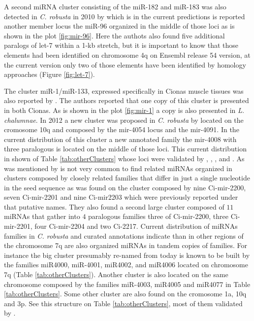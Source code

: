 \documentclass[graybox]{svmult}
\begin{document}
A second miRNA cluster consisting of the miR-182 and miR-183 was also detected 
in \textit{C. robusta} in 2010 by \cite{Keshavan2010} which is in the 
current predictions is reported another member locus the miR-96 organized in 
the middle of those loci as is shown in the plot \ref{fig:mir-96}. 
Here the authots also found five additional paralogs of let-7 within a 1-kb 
stretch, but it is important to know that those elements had been identified on 
chromosome 4q on Ensembl release 54 version, at the current version only 
two of those elements have been identified by homology approaches (Figure 
\ref{fig:let-7}).

The cluster miR-1/miR-133, expressed specifically in Cionas muscle tissues was 
also reported by \cite{Kusakabe2013}. The authors reported that one copy of 
this cluster is presented in both Cionas. As is shown in the plot 
\ref{fig:mir-1} a copy is also presented in \textit{L. chalumnae}. In 2012 a 
new cluster was proposed in \textit{C. robusta} by \cite{Terai2012} located 
on the cromosome 10q and composed by the mir-4054 locus and the mir-4091. In 
the current distribution of this cluster a new annotated family the mir-4008 
with three paralogous is located on the middle of those loci. This current 
distribution in shown of Table \ref{tab:otherClusters} whose loci were  
validated by \cite{Norden-Krichmar2007}, \cite{Fu2008}, \cite{Hendrix2010}, and 
\cite{Terai2012}. As was mentioned by \cite{Hendrix2010} is not very common to 
find related miRNAs organized in clusters composed by closely related families 
that differ in just a single nucleotide in the seed sequence as was found on 
the cluster composed by nine Ci-mir-2200, seven Ci-mir-2201 and nine Ci-mir2203 
which were previously reported under that putative names. They also found a 
second large cluster composed of $11$ miRNAs that gather into $4$ paralogous 
families three of Ci-mir-2200, three Ci-mir-2201, four Ci-mir-2204 and two 
Ci-2217. Current distribution of miRNAs families in \textit{C. robusta} and 
curated annotations indicate than in other regions of the chromosome 7q are 
also organized miRNAs in tandem copies of families. For instance the big 
cluster presumably re-named from \cite{Hendrix2010} today is known to be built 
by the families miR4000, miR-4001, miR4002, and miR4006 located on chromosome 
7q (Table \ref{tab:otherClusters}). Another cluster is also located on the same 
chromosome composed by the families miR-4003, miR4005 and miR4077 in Table 
\ref{tab:otherClusters}. Some other cluster are also found on the cromosome 1a, 
10q and 3p. See this structure on Table \ref{tab:otherClusters}, most 
of them validated by \cite{Hendrix2010}. 
\end{document}
